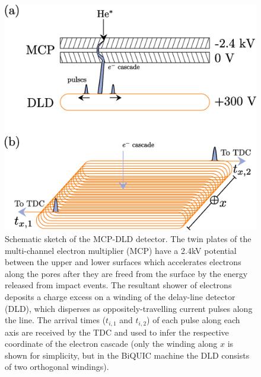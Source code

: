 	\begin{figure}
		\centering
		\includegraphics[width=\textwidth]{fig/apparatus/mcp_dld_schematic}
		\caption{Schematic sketch of the MCP-DLD detector. The twin plates of the multi-channel electron multiplier (MCP) have a 2.4kV potential between the upper and lower surfaces which accelerates electrons along the pores after they are freed from the surface by the energy released from \mhe impact events. The resultant shower of electrons deposits a charge excess on a winding of the delay-line detector (DLD), which disperses as oppositely-travelling current pulses along the line. The arrival times ($t_{i,1}$ and $t_{i,2}$) of each pulse along each axis are received by the TDC and used to infer the respective coordinate of the electron cascade (only the winding along $x$ is shown for simplicity, but in the BiQUIC machine the DLD consists of two orthogonal windings).}
		\label{fig:MCP_DLD}
	\end{figure}

